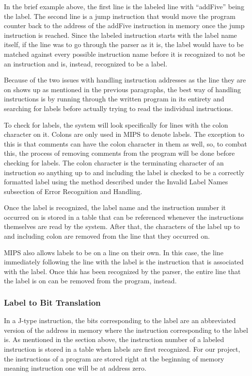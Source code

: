 \documentclass[
    parskip=half,
    fontsize=12pt,
    titlepage=firstiscover,
    toc=bibliography,
    numbers=endperiod
]{scrartcl}
\begin{document}
In the brief example above, the first line is the labeled line with
``addFive'' being the label. The second line is a jump instruction that
would move the program counter back to the address of the addFive
instruction in memory once the jump instruction is reached. Since the
labeled instruction starts with the label name itself, if the line was
to go through the parser as it is, the label would have to be matched
against every possible instruction name before it is recognized to not
be an instruction and is, instead, recognized to be a label.

Because of the two issues with handling instruction addresses as the
line they are on shows up as mentioned in the previous paragraphs, the
best way of handling instructions is by running through the written
program in its entirety and searching for labels before actually trying
to read the individual instructions.

To check for labels, the system will look specifically for lines with
the colon character on it. Colons are only used in MIPS to denote
labels. The exception to this is that comments can have the colon
character in them as well, so, to combat this, the process of removing
comments from the program will be done before checking for labels. The
colon character is the terminating character of an instruction so
anything up to and including the label is checked to be a correctly
formatted label using the method described under the Invalid Label Names
subsection of Error Recognition and Handling.

Once the label is recognized, the label name and the instruction number
it occurred on is stored in a table that can be referenced whenever the
instructions themselves are read by the system. After that, the
characters of the label up to and including colon are removed from the
line that they occurred on.

MIPS also allows labels to be on a line on their own. In this case, the
line immediately following the line with the label is the instruction
that is associated with the label. Once this has been recognized by the
parser, the entire line that the label is on can be removed from the
program, instead.

\subsubsection{Label to Bit Translation}

In a J-type instruction, the bits corresponding to the label are an
abbreviated version of the address in memory where the instruction
corresponding to the label is. As mentioned in the section above, the
instruction number of a labeled instruction is stored in a table when
labels are first recognized. For our project, the instructions of a
program are stored right at the beginning of memory meaning instruction
one will be at address zero.
\end{document}
